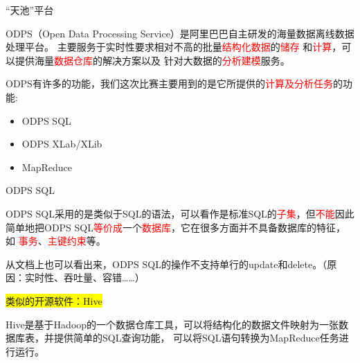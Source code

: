 \documentclass{beamer}
\begin{document}
\begin{frame}{“天池”平台}

ODPS（Open Data Processing Service）是阿里巴巴自主研发的海量数据离线数据处理平台。
主要服务于实时性要求相对不高的批量\textcolor{red}{结构化数据}的\textcolor{red}{储存}
和\textcolor{red}{计算}，可以提供海量\textcolor{red}{数据仓库}的解决方案以及
针对大数据的\textcolor{red}{分析建模}服务。

\vspace{1em}

ODPS有许多的功能，我们这次比赛主要用到的是它所提供的\textcolor{red}{计算及分析任务}的功能:
\begin{itemize}
\item ODPS SQL
\item ODPS XLab/XLib
\item MapReduce
\end{itemize}

\end{frame}

\begin{frame}{ODPS SQL}

ODPS SQL采用的是类似于SQL的语法，可以看作是标准SQL的\textcolor{red}{子集}，但\textcolor{red}{不能}因此
简单地把ODPS SQL\textcolor{red}{等价成}一个\textcolor{red}{数据库}，它在很多方面并不具备数据库的特征，如
\textcolor{red}{事务}、\textcolor{red}{主键约束}等。

\vspace{1em}

从文档上也可以看出来，ODPS SQL的操作不支持单行的update和delete。（原因：实时性、吞吐量、容错……）

\vspace{1em}

\colorbox{yellow}{类似的开源软件：Hive}

\vspace{1em}

Hive是基于Hadoop的一个数据仓库工具，可以将结构化的数据文件映射为一张数据库表，并提供简单的SQL查询功能，
可以将SQL语句转换为MapReduce任务进行运行。

\end{frame}
\end{document}
